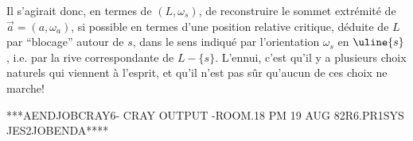 Il s'agirait donc, en termes de $(L,\omega_s)$, de reconstruire le sommet extrémité de $\vec a=(a,\omega_a)$,  si possible en termes d'une position relative critique, déduite de $L$ par ``blocage'' autour de $s$, dans le sens indiqué par l'orientation $\omega_s$ en $\uline{s}$, i.e. par la rive correspondante de $L-\{s\}$.
L'ennui, c'est qu'il y a plusieurs choix naturels qui viennent à l'esprit, et qu'il n'est pas sûr qu'aucun de ces choix ne marche!

{\ttfamily{}}
{\ttfamily ****A\quad END\quad JOB\quad CRAY6\quad- CRAY OUTPUT -\quad ROOM.18 PM 19 AUG 82\quad R6.PR1\quad SYS JES2\quad JOB\quad END\quad A****}\\
